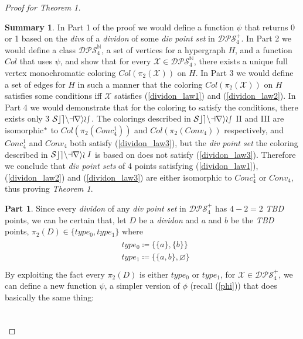\documentclass[11pt, oneside]{article}      %
\theoremstyle{definition}
\newtheorem*{summary}{Summary}
\newtheorem{proofpart}{Part}[theo]
\numberwithin{equation}{section}
\newcommand{\reff}[1]{(\ref{#1})}
\theoremstyle{c}
\begin{document}
\begin{proof}[Proof for \textit{Theorem 1}]
\begin{summary}In Part 1 of the proof we would define a function $\psi$ that returns 0 or 1 based on the \textit{divs} of a \textit{dividon} of some \textit{div point set} in $\mathscr{DPS}^+_4$. In Part 2 we would define a class $\mathscr{DPS}^\mathbb{N}_4$, a set of vertices for a hypergraph $H$, and a function $Col$ that uses $\psi$, and show that for every $\mathscr{X} \in \mathscr{DPS}^\mathbb{N}_4$, there exists a unique full vertex monochromatic coloring $Col(\pi_2(\mathscr{X}))$ on $H$. In Part 3 we would define a set of edges for $H$ in such a manner that the coloring $Col(\pi_2(\mathscr{X}))$ on $H$ satisfies some conditions iff $\mathscr{X}$ satisfies \reff{dividon_law1} and \reff{dividon_law2}. In Part 4 we would demonstrate that for the coloring to satisfy the conditions, there exists only 3 $\color{black}\mathcal{Scenarios} $. The colorings described in $\color{black}\mathcal{Scenarios}$ II and III are isomorphic$\color{black}^*$  to $Col(\pi_2(Conc_4^1))$ and $Col(\pi_2(Conv_4))$ respectively, and $Conc_4^1$ and $Conv_4$ both satisfy \reff{dividon_law3}, but the \textit{div point set} the coloring described in $\color{black}\mathcal{Scenario}\; I$ is based on does not satisfy \reff{dividon_law3}. Therefore we conclude that \textit{div point sets} of 4 points satisfying \reff{dividon_law1}, \reff{dividon_law2} and \reff{dividon_law3} are either isomorphic to $Conc_4^1$ or $Conv_4$, thus proving \textit{Theorem 1}.
\end{summary}
\begin{proofpart}
Since every \textit{dividon} of any \textit{div point set} in $ \mathscr{DPS}^+_4$ has $4-2=2$ \textit{TBD} points, we can be certain that, let $D$ be a \textit{dividon} and $a$ and $b$ be the \textit{TBD} points, $\pi_2(D) \in \{ type_0, type_1 \}$ where
\begin{gather}
\begin{split}\label{implies_phi_to_delta}
& type_0 \coloneqq \{\{a\},\{b\}\}\\
&type_1 \coloneqq \{\{a,b\},\varnothing\} \\
 \end{split}
\end{gather}
By exploiting the fact every $\pi_2(D)$ is either $type_0$ or $type_1$, for $\mathscr{X} \in \mathscr{DPS}^+_4$, we can define a new function $\psi$, a simpler version of $\phi$ (recall \reff{phi}) that does basically the same thing:
\begin{gather}\label{coloring}\begin{split}

\end{split}
\end{gather}
\end{proofpart}
\end{proof}
\end{document}
